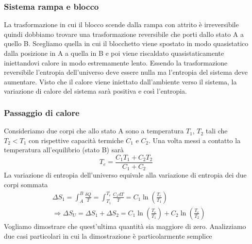 \documentclass[10pt,a4paper]{article}
\begin{document}
\subsubsection{Sistema rampa e blocco}
La trasformazione in cui il blocco scende dalla rampa con attrito è irreversibile quindi dobbiamo trovare una trasformazione reversibile che porti dallo stato A a quello B. Scegliamo quella in cui il blocchetto viene spostato in modo quasistatico dalla posizione in A a quella in B e poi viene riscaldato quasistaticamente iniettandovi calore in modo estremamente lento. Essendo la trasformazione reversibile l'entropia dell'universo deve essere nulla ma l'entropia del sistema deve aumentare. Visto che il calore viene iniettato dall'ambiente verso il sistema, la variazione di calore del sistema sarà positiva e così l'entropia. 
\subsubsection{Passaggio di calore}
Consideriamo due corpi che allo stato A sono a temperatura \(T_1\), \(T_2\) tali che \(T_2<T_1\)  con rispettive capacità termiche \(C_1\) e \(C_2\). Una volta messi a contatto la temperatura all'equilibrio (stato B) sarà
\[T_e=\frac{C_1T_1 + C_2T_2}{C_1+C_2}\]
La variazione di entropia dell'universo equivale alla variazione di entropia dei due corpi sommata
\begin{align*}
	&\Delta S_1 = \int_{A}^{B}\frac{\delta Q}{T} = \int_{T_1}^{T_e}\frac{C_1 dT}{T}=C_1 \ln\left(\frac{T_e}{T_1}\right)\\
	&\Rightarrow \Delta S_U = \Delta S_1 + \Delta S_2 = C_1 \ln\left(\frac{T_e}{T_1}\right) + C_2 \ln\left(\frac{T_e}{T_2}\right)
\end{align*}
Vogliamo dimostrare che quest'ultima quantità sia maggiore di zero. Analizziamo due casi particolari in cui la dimostrazione è particolarmente semplice
\end{document}
